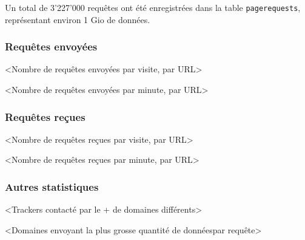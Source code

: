 		Un total de 3'227'000 requêtes ont été enregistrées dans la table \texttt{pagerequests}, représentant environ 1 Gio de données. 

		\subsubsection{Requêtes envoyées}

			<Nombre de requêtes envoyées par visite, par URL>

			<Nombre de requêtes envoyées par minute, par URL>

		\subsubsection{Requêtes reçues}

			<Nombre de requêtes reçues par visite, par URL>

			<Nombre de requêtes reçues par minute, par URL>

		\subsubsection{Autres statistiques}

			<Trackers contacté par le + de domaines différents>

			<Domaines envoyant la plus grosse quantité de donnéespar requête> 
